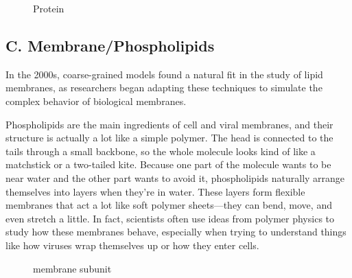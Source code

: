 \documentclass[12pt]{article}
\begin{document}
\begin{flushleft}
\begin{figure}[!ht]
  \centering
  
  \caption{Protein}
\end{figure}







	
	
	
	
	
\vspace{-1em} 

\subsection*{C. Membrane/Phospholipids}

In the 2000s, coarse-grained models found a natural fit in the study of lipid membranes, as researchers began adapting these techniques to simulate the complex behavior of biological membranes.

Phospholipids are the main ingredients of cell and viral membranes, and their structure is actually a lot like a simple polymer. The head is connected to the tails through a small backbone, so the whole molecule looks kind of like a matchstick or a two-tailed kite. Because one part of the molecule wants to be near water and the other part wants to avoid it, phospholipids naturally arrange themselves into layers when they’re in water. These layers form flexible membranes that act a lot like soft polymer sheets—they can bend, move, and even stretch a little. In fact, scientists often use ideas from polymer physics to study how these membranes behave, especially when trying to understand things like how viruses wrap themselves up or how they enter cells.
\begin{figure}[!ht]
  \centering
  \caption{membrane subunit}
\end{figure}




\end{flushleft}
\end{document}
